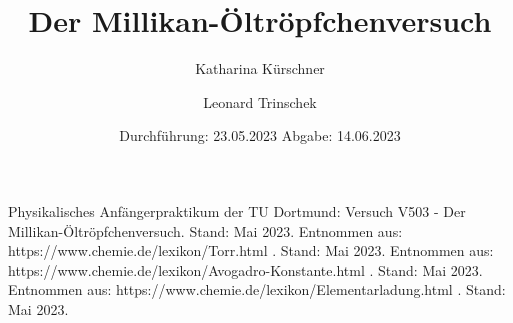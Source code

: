 

\subject{V503}
\title{Der Millikan-Öltröpfchenversuch}
\date{
  Durchführung: 23.05.2023
  \hspace{3em}
  Abgabe: 14.06.2023
}
\author{Katharina Kürschner \and Leonard Trinschek}



\maketitle
\thispagestyle{empty}
\tableofcontents
\newpage








\newpage

\begin{thebibliography}{9}
   Physikalisches Anfängerpraktikum der TU Dortmund: Versuch V503 -   Der Millikan-Öltröpfchenversuch. Stand: Mai 2023.
   Entnommen aus: https://www.chemie.de/lexikon/Torr.html . Stand: Mai 2023.
   Entnommen aus: https://www.chemie.de/lexikon/Avogadro-Konstante.html . Stand: Mai 2023.
   Entnommen aus: https://www.chemie.de/lexikon/Elementarladung.html . Stand: Mai 2023.
\end{thebibliography}


